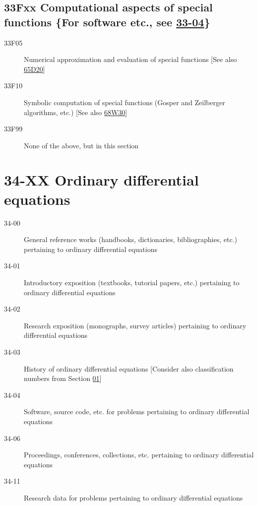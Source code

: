 \subsection*{33Fxx  Computational aspects of special functions \{For software etc., see \hyperref[33-04]{33-04}\}}\label{33Fxx}
\begin{description}  
\item [33F05]\label{33F05} Numerical approximation and evaluation of special functions [See also \hyperref[65D20]{65D20}]
\item [33F10]\label{33F10} Symbolic computation of special functions (Gosper and Zeilberger algorithms, etc.) [See also \hyperref[68W30]{68W30}]
\item [33F99]\label{33F99} None of the above, but in this section
\end{description}
\section*{34-XX Ordinary differential equations }\label{34-XX}
\begin{description}
\item [34-00]\label{34-00} General reference works (handbooks, dictionaries, bibliographies, etc.) pertaining to ordinary differential equations
\item [34-01]\label{34-01} Introductory exposition (textbooks, tutorial papers, etc.) pertaining to ordinary differential equations
\item [34-02]\label{34-02} Research exposition (monographs, survey articles) pertaining to ordinary differential equations
\item [34-03]\label{34-03} History of ordinary differential equations [Consider also classification numbers from Section \hyperref[01-XX]{01}]
\item [34-04]\label{34-04} Software, source code, etc. for problems pertaining to ordinary differential equations
\item [34-06]\label{34-06} Proceedings, conferences, collections, etc. pertaining to ordinary differential equations
\item [34-11]\label{34-11} Research data for problems pertaining to ordinary differential equations
\end{description}
